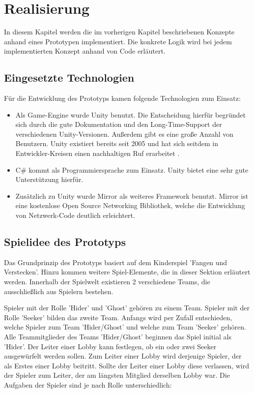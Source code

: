 \chapter{Realisierung}
\label{sec:realisierung}

In diesem Kapitel werden die im vorherigen Kapitel beschriebenen Konzepte anhand eines Prototypen implementiert. Die konkrete Logik wird bei jedem implementierten Konzept anhand von Code erläutert.

\section{Eingesetzte Technologien}

Für die Entwicklung des Prototyps kamen folgende Technologien zum Einsatz:

\begin{itemize}
	\item Als Game-Engine wurde Unity \cite{Technologies.03.02.2022} benutzt. Die Entscheidung hierfür begründet sich durch die gute Dokumentation und den Long-Time-Support der verschiedenen Unity-Versionen. Außerdem gibt es eine große Anzahl von Benutzern. Unity existiert bereits seit 2005 und hat sich seitdem in Entwickler-Kreisen einen nachhaltigen Ruf erarbeitet \cite{Wikipedia.2022c}.
	\item C\# kommt als Programmiersprache zum Einsatz. Unity bietet eine sehr gute Unterstützung hierfür.
	\item Zusätzlich zu Unity wurde Mirror\cite{.03.02.2022} als weiteres Framework benutzt. Mirror ist eine kostenlose Open Source Networking Bibliothek, welche die Entwicklung von Netzwerk-Code deutlich erleichtert.
\end{itemize}

\section{Spielidee des Prototyps}
\label{Spielidee}

Das Grundprinzip des Prototyps basiert auf dem Kinderspiel 'Fangen und Verstecken'. Hinzu kommen weitere Spiel-Elemente, die in dieser Sektion erläutert werden. Innerhalb der Spielwelt existieren 2 verschiedene Teams, die ausschließlich aus Spielern bestehen.

Spieler mit der Rolle 'Hider' und 'Ghost' gehören zu einem Team.  Spieler mit der Rolle 'Seeker' bilden das zweite Team. Anfangs wird per Zufall entschieden, welche Spieler zum Team 'Hider/Ghost' und welche zum Team 'Seeker' gehören. Alle Teammitglieder des Teams 'Hider/Ghost' beginnen das Spiel initial als 'Hider'. Der Leiter einer Lobby kann festlegen, ob ein oder zwei Seeker ausgewürfelt werden sollen. Zum Leiter einer Lobby wird derjenige Spieler, der als Erstes einer Lobby beitritt. Sollte der Leiter einer Lobby diese verlassen, wird der Spieler zum Leiter, der am längsten Mitglied derselben Lobby war. Die Aufgaben der Spieler sind je nach Rolle unterschiedlich:

